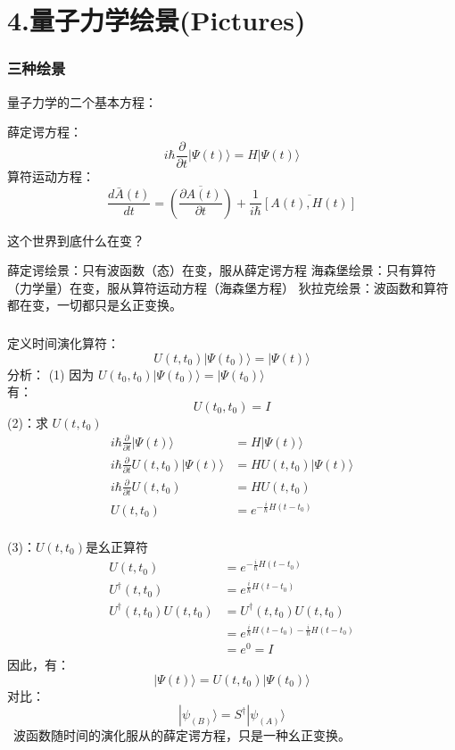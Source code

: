 \section{4.量子力学绘景(Pictures)}

\begin{frame}  
    \frametitle{三种绘景}
    量子力学的二个基本方程：  
    \begin{enumerate}
        \Item 薛定谔方程：$$ i\hbar \frac{\partial }{\partial t} |\Psi(t)\rangle = H|\Psi(t)\rangle $$
        \Item 算符运动方程：$$ \frac{d\bar{A}(t)}{dt}=\overline{(\frac{\partial A(t) }{\partial t})}  +\frac{1}{i\hbar} \overline{[A(t),H(t)]}$$
    \end{enumerate}
    这个世界到底什么在变？\\
    \begin{itemize}
        \done 薛定谔绘景：只有波函数（态）在变，服从薛定谔方程
        \done 海森堡绘景：只有算符（力学量）在变，服从算符运动方程（海森堡方程）
        \done 狄拉克绘景：波函数和算符都在变，一切都只是幺正变换。
    \end{itemize}
\end{frame} 

\begin{frame}  
    \frametitle{}  
    定义时间演化算符：
    $$ U(t,t_0) |\Psi(t_0)\rangle = |\Psi(t)\rangle  $$
    \alert{分析}：
    (1) 因为 $ U(t_0,t_0) |\Psi(t_0)\rangle = |\Psi(t_0)\rangle  $ \\
     有：$$ U(t_0,t_0)=I $$
    (2)：求 $ U(t,t_0)$
    $$ \begin{aligned}
        i\hbar \frac{\partial }{\partial t} |\Psi(t)\rangle &= H|\Psi(t)\rangle  \\
        i\hbar \frac{\partial }{\partial t}  U(t,t_0) |\Psi(t)\rangle &= H U(t,t_0) |\Psi(t)\rangle  \\
        i\hbar \frac{\partial }{\partial t}  U(t,t_0)  &= H U(t,t_0)  \\
        U(t,t_0)  &= e^{-\frac{i}{\hbar} H(t-t_0)}  \\
    \end{aligned} $$
\end{frame} 

\begin{frame}  
    (3)：$ U(t,t_0)$是幺正算符
    $$ \begin{aligned}
        U(t,t_0)  &= e^{-\frac{i}{\hbar} H(t-t_0)}  \\
        U^\dagger (t,t_0)  &= e^{\frac{i}{\hbar} H(t-t_0)}  \\
        U^\dagger (t,t_0)U(t,t_0) &= U^\dagger (t,t_0)U(t,t_0) \\
         &=e^{\frac{i}{\hbar} H(t-t_0)-\frac{i}{\hbar} H(t-t_0)} \\
         &=e^0=I
    \end{aligned} $$
    因此，有：
    $$ |\Psi(t)\rangle = U(t,t_0) |\Psi(t_0)\rangle   $$
    对比： 
    $$ |\psi_{(B)}\rangle = S^\dagger |\psi_{(A)}\rangle $$
    \Note ~波函数随时间的演化服从的薛定谔方程，只是一种幺正变换。
\end{frame} 


